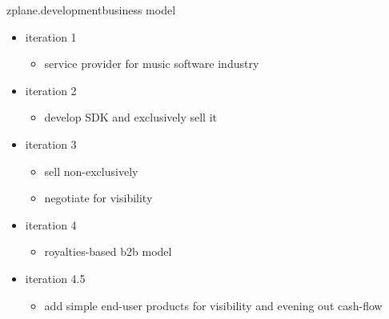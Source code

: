         \begin{frame}{zplane.development}{business model}
					\begin{itemize}
						\item 	iteration 1
							\begin{itemize}
								\item service provider for music software industry
							\end{itemize}
						\smallskip
						\item<2-> 	iteration 2
							\begin{itemize}
								\item develop SDK and exclusively sell it
							\end{itemize}
						\smallskip
						\item<3->		iteration 3
							\begin{itemize}
								\item 	sell non-exclusively
								\item		negotiate for visibility
							\end{itemize}
						\smallskip
						\item<4->		iteration 4
							\begin{itemize}
								\item 	royalties-based b2b model
							\end{itemize}
						\smallskip
						\item<5->		iteration 4.5
							\begin{itemize}
								\item 	add simple end-user products for visibility and evening out cash-flow
							\end{itemize}
					\end{itemize}
        \end{frame}
				
